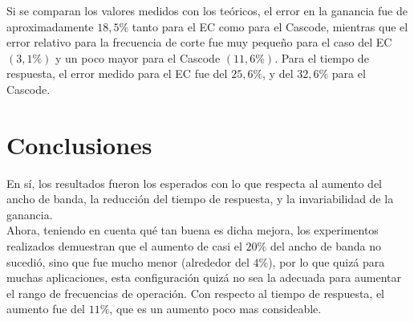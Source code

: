 \documentclass[letterpaper, 10 pt, conference]{ieeeconf}  %
\begin{document}
Si se comparan los valores medidos con los teóricos, el error en la ganancia fue de aproximadamente $18,5\%$ tanto para el EC como para el Cascode, mientras que el error relativo para la frecuencia de corte fue muy pequeño para el caso del EC $(3,1\%)$ y un poco mayor para el Cascode $(11,6\%)$.
Para el tiempo de respuesta, el error medido para el EC fue del $25,6\%$, y del $32,6\%$ para el Cascode.

\section{Conclusiones}

En sí, los resultados fueron los esperados con lo que respecta al aumento del ancho de banda, la reducción del tiempo de respuesta, y la invariabilidad de la ganancia.\\
Ahora, teniendo en cuenta qué tan buena es dicha mejora, los experimentos realizados demuestran que el aumento de casi el $20\%$ del ancho de banda no sucedió, sino que fue mucho menor (alrededor del $4\%$), por lo que quizá para muchas aplicaciones, esta configuración quizá no sea la adecuada para aumentar el rango de frecuencias de operación.
Con respecto al tiempo de respuesta, el aumento fue del $11\%$, que es un aumento poco mas consideable.

\addtolength{\textheight}{-12cm}   %










\end{document}
